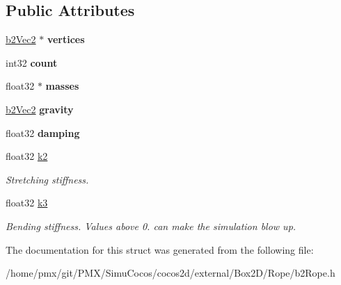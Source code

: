 \subsection*{Public Attributes}
\begin{DoxyCompactItemize}
\item 
\mbox{\label{structb2RopeDef_a3c98f874afff329234125318488c867b}} 
\hyperlink{structb2Vec2}{b2\+Vec2} $\ast$ {\bfseries vertices}
\item 
\mbox{\label{structb2RopeDef_a0c75d4289a807e31f32dc43a2276671f}} 
int32 {\bfseries count}
\item 
\mbox{\label{structb2RopeDef_ad801fc889026def82c41329b5b6133c0}} 
float32 $\ast$ {\bfseries masses}
\item 
\mbox{\label{structb2RopeDef_a90d98969150047662ce835ec1670fb32}} 
\hyperlink{structb2Vec2}{b2\+Vec2} {\bfseries gravity}
\item 
\mbox{\label{structb2RopeDef_a13ad872bb9d4926f3e4e49b7061613cb}} 
float32 {\bfseries damping}
\item 
\mbox{\label{structb2RopeDef_a89de5d2c15afacd41722c76523e33826}} 
float32 \hyperlink{structb2RopeDef_a89de5d2c15afacd41722c76523e33826}{k2}
\begin{DoxyCompactList}\small\item\em Stretching stiffness. \end{DoxyCompactList}\item 
\mbox{\label{structb2RopeDef_a3f4749e0a309b53daf804c75adfb4ba8}} 
float32 \hyperlink{structb2RopeDef_a3f4749e0a309b53daf804c75adfb4ba8}{k3}
\begin{DoxyCompactList}\small\item\em Bending stiffness. Values above 0. can make the simulation blow up. \end{DoxyCompactList}\end{DoxyCompactItemize}


The documentation for this struct was generated from the following file\+:\begin{DoxyCompactItemize}
\item 
/home/pmx/git/\+P\+M\+X/\+Simu\+Cocos/cocos2d/external/\+Box2\+D/\+Rope/b2\+Rope.\+h\end{DoxyCompactItemize}
